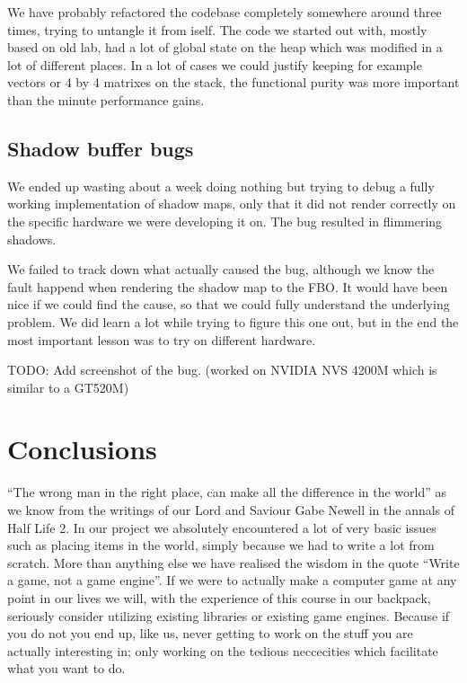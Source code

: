 \documentclass[a4paper,12pt]{article}
\begin{document}
We have probably refactored the codebase completely somewhere around three times, trying to untangle it from iself. The code we started out with, mostly based on old lab, had a lot of global state on the heap which was modified in a lot of different places. In a lot of cases we could justify keeping for example vectors or 4 by 4 matrixes on the stack, the functional purity was more important than the minute performance gains.

\subsection{Shadow buffer bugs}

We ended up wasting about a week doing nothing but trying to debug a fully working implementation of shadow maps, only that it did not render correctly on the specific hardware we were developing it on. The bug resulted in flimmering shadows. 

We failed to track down what actually caused the bug, although we know the fault happend when rendering the shadow map to the FBO. It would have been nice if we could find the cause, so that we could fully understand the underlying problem. We did learn a lot while trying to figure this one out, but in the end the most important lesson was to try on different hardware.

TODO: Add screenshot of the bug. (worked on NVIDIA NVS 4200M which is similar to a GT520M)



\section{Conclusions}

``The wrong man in the right place, can make all the difference in the world'' as we know from the writings of our Lord and Saviour Gabe Newell in the annals of Half Life 2. In our project we absolutely encountered a lot of very basic issues such as placing items in the world, simply because we had to write a lot from scratch. More than anything else we have realised the wisdom in the quote ``Write a game, not a game engine''. If we were to actually make a computer game at any point in our lives we will, with the experience of this course in our backpack, seriously consider utilizing existing libraries or existing game engines. Because if you do not you end up, like us, never getting to work on the stuff you are actually interesting in; only working on the tedious neccecities which facilitate what you want to do.
\end{document}
